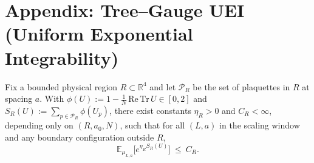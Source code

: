 \documentclass[11pt]{amsart}
\begin{document}
\section{Appendix: Tree--Gauge UEI (Uniform Exponential Integrability)}

\begin{theorem}\label{thm:uei-fixed-region}
Fix a bounded physical region $R\subset\mathbb{R}^4$ and let $\mathcal{P}_R$ be the set of plaquettes in $R$ at spacing $a$. With $\phi(U):=1-\tfrac{1}{N}\,\mathrm{Re\,Tr}\,U\in[0,2]$ and $S_R(U):=\sum_{p\in\mathcal{P}_R}\phi(U_p)$, there exist constants $\eta_R>0$ and $C_R<\infty$, depending only on $(R,a_0,N)$, such that for all $(L,a)$ in the scaling window and any boundary configuration outside $R$,
\[
  \mathbb{E}_{\mu_{L,a}}\big[e^{\eta_R S_R(U)}\big]\ \le\ C_R.
\]
\end{theorem}
\end{document}
